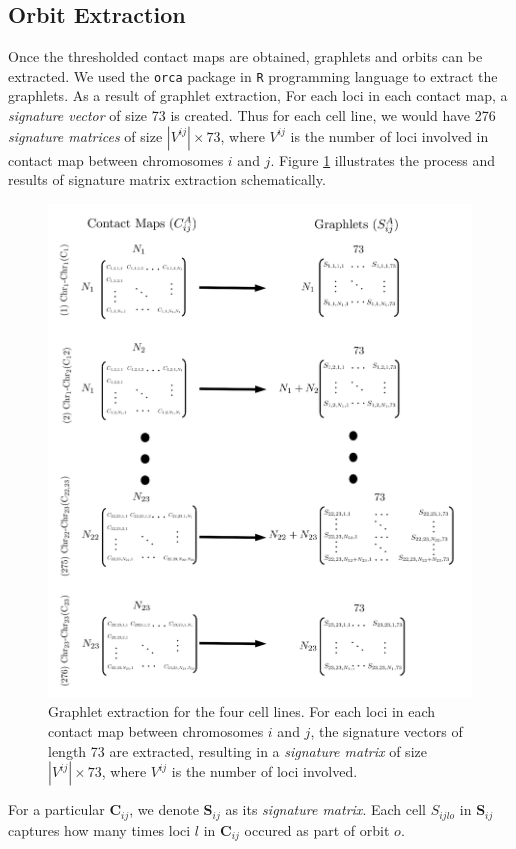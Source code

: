 \documentclass[a4,center,fleqn]{NAR}
\begin{document}
\subsection{Orbit Extraction}
Once the thresholded contact maps are obtained, graphlets and orbits can be 
extracted. We used the \texttt{orca} package in \texttt{R} programming 
language to extract the graphlets. As a result of graphlet extraction, 
For each loci in each contact map, a \textit{signature vector} of size
73 is created. Thus for each cell line, we would have 276 
\textit{signature matrices} of
size $|V^{ij}|\times 73$, where $V^{ij}$ is the number of loci
involved in contact map between chromosomes $i$ and $j$. Figure
\ref{fig:graphlet_extraction} illustrates the process and results
of signature matrix extraction schematically.
\begin{figure}
    \centering
    \includegraphics[width=.47\textwidth]{figures/graphlet_extraction.png}
    \caption{Graphlet extraction for the four cell lines. For each
    loci in each contact map between chromosomes $i$ and $j$, 
    the signature vectors of length 73 are extracted, resulting 
    in a \textit{signature matrix} of size $|V^{ij}| \times 73$,
    where $V^{ij}$ 
    is the number of loci involved.}
    \label{fig:graphlet_extraction}
\end{figure}

For a particular
$\mathbf{C}_{ij}$, we denote $\mathbf{S}_{ij}$ as its \textit{signature 
matrix}. Each cell $S_{ijlo}$ in $\mathbf{S}_{ij}$ captures how many
times loci $l$ in $\mathbf{C}_{ij}$ occured as part of orbit $o$.
\end{document}

